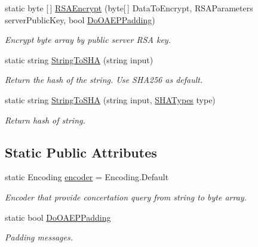 \begin{DoxyCompactItemize}
static byte \mbox{[}$\,$\mbox{]} \mbox{\hyperlink{class_pipes_provider_1_1_security_1_1_crypto_a09f2c39c0c97bf871f3ab9df2f1a40fd}{R\+S\+A\+Encrypt}} (byte\mbox{[}$\,$\mbox{]} Data\+To\+Encrypt, R\+S\+A\+Parameters server\+Public\+Key, bool \mbox{\hyperlink{class_pipes_provider_1_1_security_1_1_crypto_a47ca964d3fea31884d730936a9be1c81}{Do\+O\+A\+E\+P\+Padding}})
\begin{DoxyCompactList}\small\item\em Encrypt byte array by public server R\+SA key. \end{DoxyCompactList}\item 
static string \mbox{\hyperlink{class_pipes_provider_1_1_security_1_1_crypto_aa02bcc81446a930930bb43ff46981f60}{String\+To\+S\+HA}} (string input)
\begin{DoxyCompactList}\small\item\em Return the hash of the string. Use S\+H\+A256 as default. \end{DoxyCompactList}\item 
static string \mbox{\hyperlink{class_pipes_provider_1_1_security_1_1_crypto_af652a2847acd1502625c5496c4887274}{String\+To\+S\+HA}} (string input, \mbox{\hyperlink{class_pipes_provider_1_1_security_1_1_crypto_a6956e9aac98864917946b750dee3596e}{S\+H\+A\+Types}} type)
\begin{DoxyCompactList}\small\item\em Return hash of string. \end{DoxyCompactList}\end{DoxyCompactItemize}
\subsection*{Static Public Attributes}
\begin{DoxyCompactItemize}
\item 
static Encoding \mbox{\hyperlink{class_pipes_provider_1_1_security_1_1_crypto_a891868b922c2ce6a0f85a01c6bf684e5}{encoder}} = Encoding.\+Default
\begin{DoxyCompactList}\small\item\em Encoder that provide concertation query from string to byte array. \end{DoxyCompactList}\item 
static bool \mbox{\hyperlink{class_pipes_provider_1_1_security_1_1_crypto_a47ca964d3fea31884d730936a9be1c81}{Do\+O\+A\+E\+P\+Padding}}
\begin{DoxyCompactList}\small\item\em Padding messages. \end{DoxyCompactList}\end{DoxyCompactItemize}
